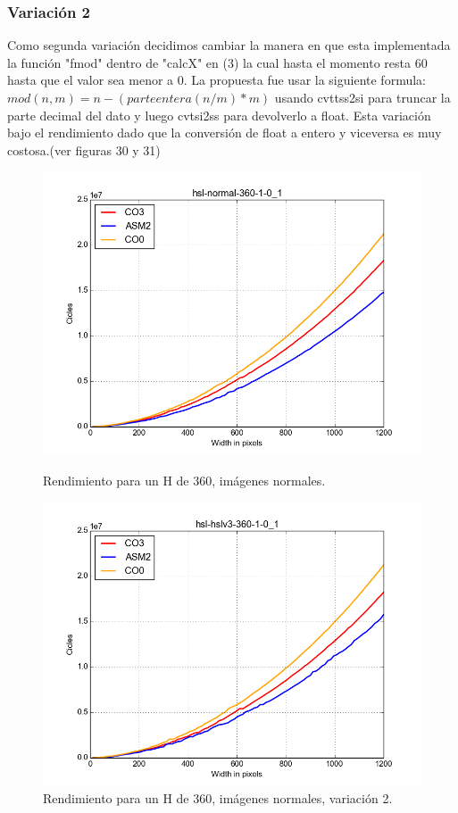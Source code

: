 \documentclass[a4paper]{article}
\begin{document}
\subsubsection{Variación 2}
Como segunda variación decidimos cambiar la manera en que esta implementada la función "fmod" dentro de "calcX" en (3) la cual hasta el momento resta 60 hasta que el valor sea menor a 0. La propuesta fue usar la siguiente formula: $mod(n, m) = n - ( parteentera(n/m) * m )$ usando cvttss2si para truncar la parte decimal del dato y luego cvtsi2ss para devolverlo a float. Esta variación bajo el rendimiento dado que la conversión de float a entero y viceversa es muy costosa.(ver figuras 30 y 31)

\begin{figure}[H]
  \begin{center}
    \includegraphics[scale=0.4]{imagenes/hsl5.png}
    \caption{Rendimiento para un H de 360, imágenes normales.}
    \label{fig:exp1-1}
  \end{center}
  \endminipage\hfill
  \begin{center}
    \includegraphics[scale=0.4]{imagenes/hsl9.png}
    \caption{Rendimiento para un H de 360, imágenes normales, variación 2.}
    \label{fig:exp1-0.5}
  \end{center}
  \endminipage\hfill
\end{figure}
\end{document}
